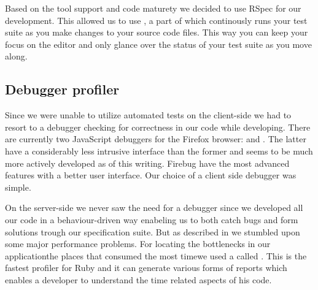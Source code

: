 Based on the tool support and code maturety we decided to use RSpec for our
development. This allowed us to use , a part of
%
which continously runs your test suite as you make changes to your source code
files. This way you can keep your focus on the editor and only glance over the
status of your test suite as you move along.

\subsection{Debugger \oldand profiler}

Since we were unable to utilize automated tests on the client-side we had to
resort to a debugger checking for correctness in our code while developing.
There are currently two JavaScript debuggers for the Firefox browser:
%
and .%
The latter have a considerably less intrusive interface than the former and
seems to be much more actively developed as of this writing. Firebug have the
most advanced features with a better user interface. Our choice of a client
side debugger was simple.

On the server-side we never saw the need for a debugger since we developed all
our code in a behaviour-driven way enabeling us to both catch bugs and form
solutions trough our specification suite. But as described in
 we stumbled upon some major
performance problems. For locating the bottlenecks in our
application\dash{}the places that consumed the most time\dash{}we used
a %
called .%
This is the fastest profiler for Ruby and it can generate various forms of
reports which enables a developer to understand the time related aspects of
his code.

